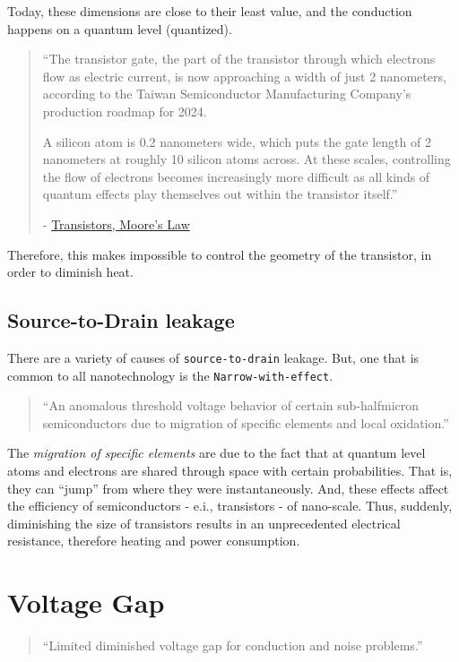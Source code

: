 \documentclass[12pt]{article}
\begin{document}
Today, these dimensions are close to their least value, and the conduction
happens on a quantum level (quantized).

\begin{quote}
  ``The transistor gate, the part of the transistor through which electrons flow as electric current, is now approaching a width of just 2 nanometers, according to the Taiwan Semiconductor Manufacturing Company’s production roadmap for 2024.

  A silicon atom is 0.2 nanometers wide, which puts the gate length of 2 nanometers at roughly 10 silicon atoms across. At these scales, controlling the flow of electrons becomes increasingly more difficult as all kinds of quantum effects play themselves out within the transistor itself.''

  - \href{https://interestingengineering.com/transistors-moores-law}{Transistors, Moore's Law}
\end{quote}
Therefore, this makes impossible to control the geometry of the transistor, in order to
diminish heat.

\subsection{Source-to-Drain leakage}
\label{sec:org426a78d}
There are a variety of causes of \texttt{source-to-drain} leakage. But, one that is
common to all nanotechnology is the \texttt{Narrow-with-effect}.

\begin{quote}
  ``An anomalous threshold voltage behavior of certain sub-halfmicron
  semiconductors due to migration of specific elements and local oxidation.''
\end{quote}

The \emph{migration of specific elements} are due to the fact that at quantum level
atoms and electrons are shared through space with certain probabilities. That
is, they can ``jump'' from where they were instantaneously. And, these effects
affect the efficiency of semiconductors - e.i., transistors - of nano-scale.
Thus, suddenly, diminishing the size of transistors results in an unprecedented
electrical resistance, therefore heating and power consumption.

\clearpage
\section{Voltage Gap}
\label{sec:orga59ee5d}
\begin{quote}
  ``Limited diminished voltage gap for conduction and noise problems.''
\end{quote}
\end{document}
